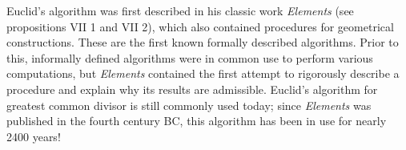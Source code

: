 \documentclass{article}
\theoremstyle{definition}
\theoremstyle{definition}
\theoremstyle{definition}
\begin{document}
Euclid's algorithm was first described in his classic work {\it Elements} (see propositions VII 1 and VII 2),
which also contained procedures
for geometrical constructions. These are the first known 
formally described algorithms. Prior to this, informally defined algorithms were in common use to 
perform various computations, but {\it Elements} contained the first attempt to rigorously 
describe a procedure and explain why its results are admissible. Euclid's algorithm for greatest 
common divisor is still commonly used today; since {\it Elements} was published in the fourth 
century BC, this algorithm has been in use for nearly 2400 years!
\end{document}

